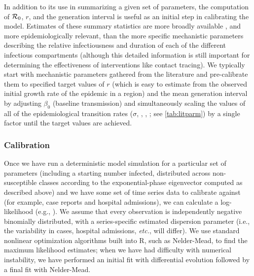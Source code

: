 \documentclass[12pt]{article}\usepackage[]{graphicx}\usepackage[]{color}
\begin{document}
In addition to its use in summarizing a given set of parameters, the computation of ${\mathcal R}_0$, $r$, and the generation interval is useful as an initial step in calibrating the model. 
Estimates of these summary statistics are more broadly available \cite{park2020reconciling}, and more epidemiologically relevant, than the more specific mechanistic parameters describing the relative infectiousness and duration of each of the different infectious compartments (although this detailed information is still important for determining the effectiveness of interventions like contact tracing). 
We typically start with mechanistic parameters gathered from the literature and pre-calibrate them to specified target values of $r$ (which is easy to estimate from the observed initial growth rate of the epidemic in a region) and the mean generation interval by adjusting $\beta_0$ (baseline transmission) and simultaneously scaling the values of all of the epidemiological transition rates ($\sigma$, , , ;
see \cref{tab:litparm})
by a single factor until the target values are achieved.

\subsubsection*{Calibration}

Once we have run a deterministic model simulation for a particular set of parameters (including a starting number infected, distributed across non-susceptible classes according to the exponential-phase eigenvector computed as described above) and we have some set of time series data to calibrate against (for example, case reports and hospital admissions), we can calculate a log-likelihood (e.g., \cite{Bolk08}). 
We assume that every observation is independently negative binomially distributed, with a series-specific estimated dispersion parameter (i.e., the variability in cases, hospital admissions, \emph{etc.}, will differ). 
We use standard nonlinear optimization algorithms built into R, such as Nelder-Mead, to find the maximum likelihood estimates; when we have had difficulty with numerical instability, we have performed an initial fit with differential evolution \cite{Mull+11} followed by a final fit with Nelder-Mead.
\end{document}
